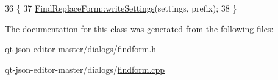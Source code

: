 \begin{DoxyCode}
36                                                                        \{
37     \hyperlink{class_find_replace_form_a8746401be4fbab54b6019a76e05e7b43}{FindReplaceForm::writeSettings}(settings, prefix);
38 \}
\end{DoxyCode}


The documentation for this class was generated from the following files\+:\begin{DoxyCompactItemize}
\item 
qt-\/json-\/editor-\/master/dialogs/\hyperlink{findform_8h}{findform.\+h}\item 
qt-\/json-\/editor-\/master/dialogs/\hyperlink{findform_8cpp}{findform.\+cpp}\end{DoxyCompactItemize}
